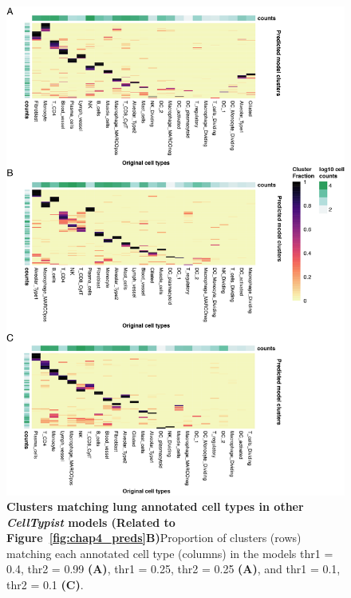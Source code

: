 \begin{figure}[ht!] 
\centering
\includegraphics[scale=0.85]{Appendix3/Figs/appB_otherClustFrac_lung.png} %
\caption[Clusters matching lung annotated cell types in other \textit{CellTypist} models]{\textbf{Clusters matching lung annotated cell types in other \textit{CellTypist} models (Related to Figure~\ref{fig:chap4_preds}B)}\newline Proportion of clusters (rows) matching each annotated cell type (columns) in the models thr1 = 0.4, thr2 = 0.99 \textbf{(A)}, thr1 = 0.25, thr2 = 0.25 \textbf{(A)}, and thr1 = 0.1, thr2 = 0.1 \textbf{(C)}.}
\label{fig:appB_othercl}
\end{figure}


